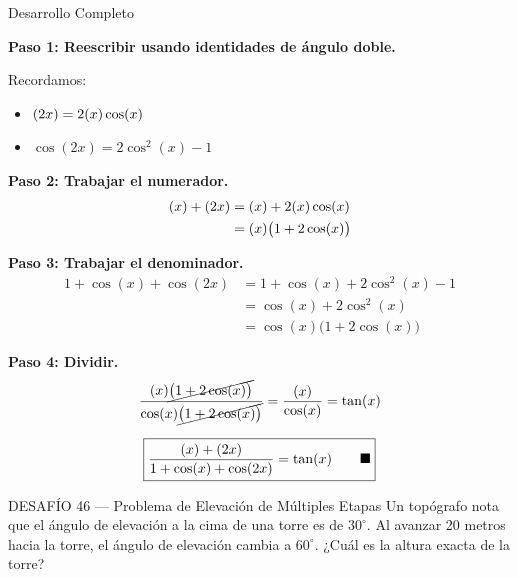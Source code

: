 \documentclass[letterpaper, 12pt]{article}
\let\sin\relax
\DeclareMathOperator{\sin}{sen}
\begin{document}
\begin{solucionbox}{Desarrollo Completo}

\textbf{Paso 1: Reescribir usando identidades de ángulo doble.}

Recordamos:
\begin{itemize}
    \item $\sin(2x) = 2\sin(x)\cos(x)$
    \item $\cos(2x) = 2\cos^2(x) - 1$
\end{itemize}

\textbf{Paso 2: Trabajar el numerador.}
\begin{align*}
    \sin(x) + \sin(2x) &= \sin(x) + 2\sin(x)\cos(x) \\
    &= \sin(x)\bigl(1 + 2\cos(x)\bigr)
\end{align*}

\textbf{Paso 3: Trabajar el denominador.}
\begin{align*}
    1 + \cos(x) + \cos(2x) &= 1 + \cos(x) + 2\cos^2(x) - 1 \\
    &= \cos(x) + 2\cos^2(x) \\
    &= \cos(x)\bigl(1 + 2\cos(x)\bigr)
\end{align*}

\textbf{Paso 4: Dividir.}
\[
    \frac{\sin(x)\cancel{\bigl(1 + 2\cos(x)\bigr)}}{\cos(x)\cancel{\bigl(1 + 2\cos(x)\bigr)}} = \frac{\sin(x)}{\cos(x)} = \tan(x)
\]

\[\boxed{\frac{\sin(x) + \sin(2x)}{1 + \cos(x) + \cos(2x)} = \tan(x) \qquad \blacksquare}\]
\end{solucionbox}

\newpage

\begin{desafiobox}{DESAFÍO 46 — Problema de Elevación de Múltiples Etapas}
Un topógrafo nota que el ángulo de elevación a la cima de una torre es de $30^\circ$. Al avanzar 20 metros hacia la torre, el ángulo de elevación cambia a $60^\circ$. ¿Cuál es la altura exacta de la torre?
\end{desafiobox}
\end{document}
